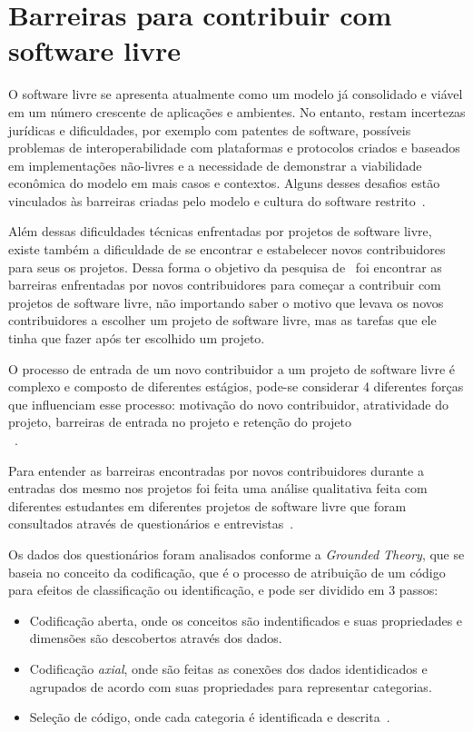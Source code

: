 \chapter{Barreiras para contribuir com software livre}
\label{barreirasSL}

O software livre se apresenta atualmente como um modelo já consolidado e viável
em um número crescente de aplicações e ambientes. No entanto, restam incertezas
jurídicas e dificuldades, por exemplo com patentes de software, possíveis problemas de
interoperabilidade com plataformas e protocolos criados e baseados em implementações
não-livres e a necessidade de demonstrar a viabilidade econômica do modelo em mais
casos e contextos. Alguns desses desafios estão vinculados às barreiras criadas pelo
modelo e cultura do software restrito~\cite{kon2012software}.

Além dessas dificuldades técnicas enfrentadas por projetos de software livre, existe 
também a dificuldade de se encontrar e estabelecer novos contribuidores para seus os
projetos. Dessa forma o objetivo da pesquisa de~ foi encontrar as barreiras enfrentadas 
por novos contribuidores para começar a contribuir com projetos de software livre, 
não importando saber o motivo que levava os novos contribuidores
a escolher um projeto de software livre, mas as tarefas que ele tinha que fazer após
ter escolhido um projeto.

O processo de entrada de um novo contribuidor a um projeto de software livre é complexo
e composto de diferentes estágios, pode-se considerar 4 diferentes forças que influenciam 
esse processo: motivação do novo contribuidor, atratividade do projeto, barreiras de entrada
no projeto e retenção do projeto\\~\cite{Steinmacher:2014:HLO:2593702.2593704, 2049}.

Para entender as barreiras encontradas por novos contribuidores durante a entradas dos
mesmo nos projetos foi feita uma análise qualitativa feita com diferentes estudantes em
diferentes projetos de software livre que foram consultados através de questionários
e entrevistas~\cite{Steinmacher:2014:HLO:2593702.2593704}.

Os dados dos questionários foram analisados conforme a \textit{Grounded Theory},
que se baseia no conceito da codificação, que é o processo de atribuição de um código
para efeitos de classificação ou identificação, e pode ser dividido em 3 passos:

\begin{itemize}

\item Codificação aberta, onde os conceitos são indentificados e suas propriedades e dimensões
são descobertos através dos dados.

\item Codificação \textit{axial}, onde são feitas as conexões dos dados identidicados e 
agrupados de acordo com suas propriedades para representar categorias.

\item Seleção de código, onde cada categoria é identificada e descrita~\cite{strauss1998basics}.

\end{itemize}


